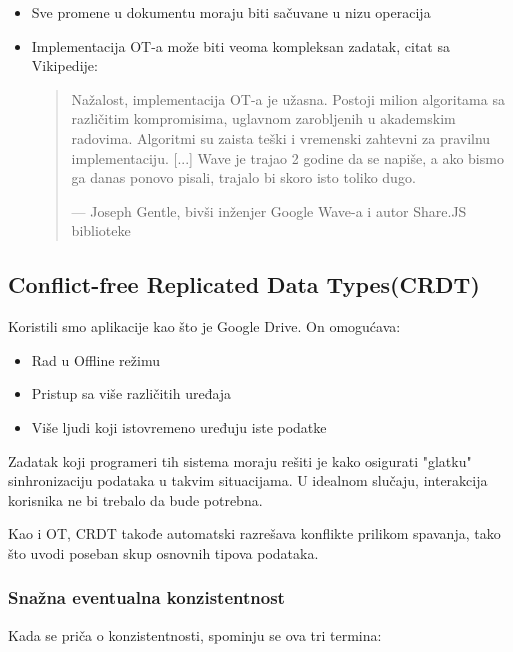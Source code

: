 \documentclass[12pt]{article}
\begin{document}
\begin{itemize}
	\item Sve promene u dokumentu moraju biti sačuvane u nizu operacija
	\item Implementacija OT-a može biti veoma kompleksan zadatak, citat sa Vikipedije:
	      
	      \begin{quote}
	      	Nažalost, implementacija OT-a je užasna. Postoji milion algoritama sa različitim kompromisima, uglavnom zarobljenih u akademskim radovima. Algoritmi su zaista teški i vremenski zahtevni za pravilnu implementaciju. [...] Wave je trajao 2 godine da se napiše, a ako bismo ga danas ponovo pisali, trajalo bi skoro isto toliko dugo. 
	      	\begin{flushright}
	      		--- Joseph Gentle, bivši inženjer Google Wave-a i autor Share.JS biblioteke
	      	\end{flushright}
	      \end{quote}
	              
\end{itemize}

\subsection{Conflict-free Replicated Data Types(CRDT)}

Koristili smo aplikacije kao što je Google Drive. On omogućava:

\begin{itemize}
	\item Rad u Offline režimu
	\item Pristup sa više različitih uređaja
	\item Više ljudi koji istovremeno uređuju iste podatke
\end{itemize}

Zadatak koji programeri tih sistema moraju rešiti je kako osigurati "glatku" sinhronizaciju podataka u takvim situacijama. U idealnom slučaju, interakcija korisnika ne bi trebalo da bude potrebna.

Kao i OT, CRDT takođe automatski razrešava konflikte prilikom spavanja, tako što uvodi poseban skup osnovnih tipova podataka.

\subsubsection{Snažna eventualna konzistentnost}

Kada se priča o konzistentnosti, spominju se ova tri termina:
\end{document}
